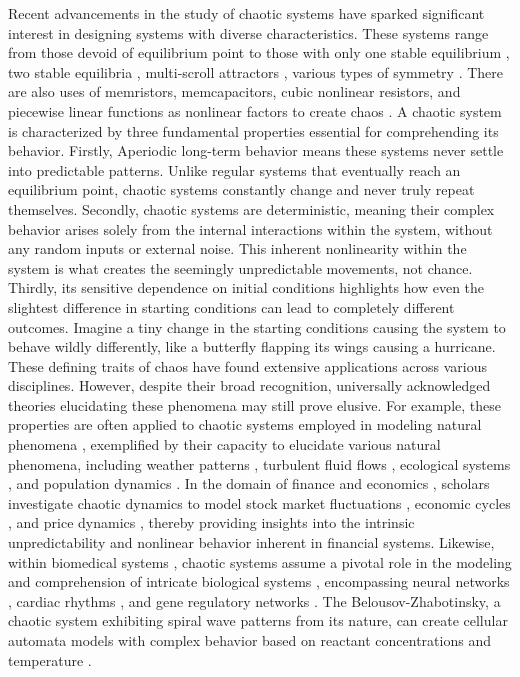 \documentclass[11pt]{article}
\theoremstyle{definition}
\begin{document}
Recent advancements in the study of chaotic systems have sparked significant interest in designing systems with diverse characteristics. These systems range from those devoid of equilibrium point \cite{ren_new_2018,wang_s-box_2019} to those with only one stable equilibrium \cite{wang_chaotic_2011}, two stable equilibria \cite{wang_chaotic_2017}, multi-scroll attractors \cite{rajagopal_multiscroll_2019,pehlivan_multiscroll_2019}, various types of symmetry \cite{field_symmetry_2009}. There are also uses of memristors, memcapacitors, cubic nonlinear resistors, and piecewise linear functions as nonlinear factors to create chaos \cite{article,varan_control_2018,rajagopal_dynamical_2019,akgul_chaotic_2019,rajagopal_simple_2019}.
A chaotic system is characterized by three fundamental properties essential for comprehending its behavior. Firstly, Aperiodic long-term behavior means these systems never settle into predictable patterns. Unlike regular systems that eventually reach an equilibrium point, chaotic systems constantly change and never truly repeat themselves. Secondly, chaotic systems are deterministic, meaning their complex behavior arises solely from the internal interactions within the system, without any random inputs or external noise. This inherent nonlinearity within the system is what creates the seemingly unpredictable movements, not chance. Thirdly, its sensitive dependence on initial conditions highlights how even the slightest difference in starting conditions can lead to completely different outcomes. Imagine a tiny change in the starting conditions causing the system to behave wildly differently, like a butterfly flapping its wings causing a hurricane. These defining traits of chaos have found extensive applications across various disciplines. However, despite their broad recognition, universally acknowledged theories elucidating these phenomena may still prove elusive. For example, these properties are often applied to chaotic systems employed in modeling natural phenomena \cite{jan_dynamical_2022}, exemplified by their capacity to elucidate various natural phenomena, including weather patterns \cite{knight_metlink_2021}, turbulent fluid flows \cite{turbulent}, ecological systems \cite{crawford_ecological_2020}, and population dynamics \cite{jung_chaotic_2020}. In the domain of finance and economics \cite{liao_study_2020}, scholars investigate chaotic dynamics to model stock market fluctuations \cite{vogl_chaos_2024}, economic cycles \cite{tusset_dynamic_2023}, and price dynamics \cite{ait_omar_chaotic_2022}, thereby providing insights into the intrinsic unpredictability and nonlinear behavior inherent in financial systems. Likewise, within biomedical systems \cite{korolj_healthy_2019}, chaotic systems assume a pivotal role in the modeling and comprehension of intricate biological systems \cite{li_incorporating_2023}, encompassing neural networks \cite{lin_chaotic_2020}, cardiac rhythms \cite{cheffer_biochaos_2022}, and gene regulatory networks \cite{uthamacumaran_review_2021}. The Belousov-Zhabotinsky, a chaotic system exhibiting spiral wave patterns from its nature, can create cellular automata models with complex behavior based on reactant concentrations and temperature \cite{karimov_empirically_2023,luengviriya_meandering_2013,chopard_cellular_2022}.
\end{document}
